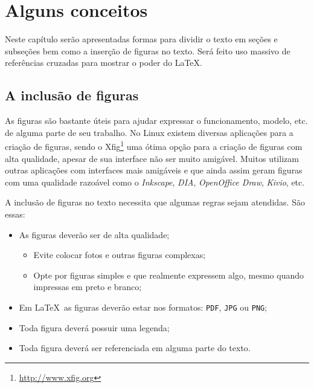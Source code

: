 
\chapter{Alguns conceitos}
\label{c_cap2}

Neste capítulo serão apresentadas formas para dividir o texto em seções e subseções bem como a inserção de figuras no texto. Será feito uso massivo de referências cruzadas para mostrar o poder do \LaTeX.

\section{A inclusão de figuras}
\label{s_c2_figuras}

As figuras são bastante úteis para ajudar expressar o funcionamento, modelo, etc. de alguma parte de seu trabalho. No Linux existem diversas aplicações para a criação de figuras, sendo o Xfig\footnote{\url{http://www.xfig.org}} uma ótima opção para a criação de figuras com alta qualidade, apesar de sua interface não ser muito amigável. Muitos utilizam outras aplicações com interfaces mais amigáveis e que ainda assim geram figuras com uma qualidade razoável como o \textit{Inkscape}, \textit{DIA}, \textit{OpenOffice Draw}, \textit{Kivio}, etc.

A inclusão de figuras no texto necessita que algumas regras sejam atendidas. São essas:

\begin{itemize}
	\item As figuras deverão ser de alta qualidade;
	\begin{itemize}
		\item Evite colocar fotos e outras figuras complexas;
		\item Opte por figuras simples e que realmente expressem algo, mesmo quando impressas em preto e branco;
	\end{itemize}
	\item Em \LaTeX~as figuras deverão estar nos formatos: \texttt{PDF}, \texttt{JPG} ou \texttt{PNG};
	\item Toda figura deverá possuir uma legenda;
	\item Toda figura deverá ser referenciada em alguma parte do texto.
\end{itemize}

